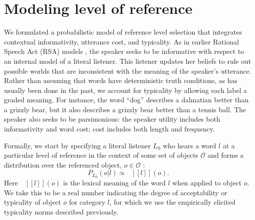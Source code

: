 \documentclass[10pt,letterpaper]{article}
\newcommand{\ndg}[1]{\textcolor{Green}{[ndg: #1]}}
\newcommand{\denote}[1]{\mbox{ $[\![ #1 ]\!]$}}
\begin{document}


\section{\bf Modeling level of reference}

We formulated a probabilistic model of reference level selection that integrates contextual informativity, utterance cost, and typicality.
As in earlier Rational Speech Act (RSA) models \cite{frank2012, goodmanstuhlmueller2013}, the speaker seeks to be informative with respect to an internal model of a literal listener. This listener updates her beliefs to rule out possible worlds that are inconsistent with the meaning of the speaker's utterance. Rather than assuming that words have deterministic truth conditions, as has usually been done in the past, we account for typicality by allowing each label a graded meaning. For instance, the word ``dog'' describes a dalmatian better than a grizzly bear, but it also describes a grizzly bear better than a tennis ball.
The speaker also seeks to be parsimonious: the speaker utility includes both informativity and word cost; cost includes both length and frequency.

Formally, we start by specifying a literal listener $L_0$ who hears a word $l$ at a particular level of reference  in the context of some set of objects $\mathcal{O}$ and forms a distribution over the referenced object, $o \in \mathcal{O}$ : 
$$P_{L_0}(o | l) \propto \denote{l}(o).$$
Here $\denote{l}(o)$ is the lexical meaning of the word $l$ when applied to object $o$. We take this to be a real number indicating the degree of acceptability or typicality of object $o$ for category $l$, for which we use the empirically elicited typicality norms described previously. %
\end{document}
